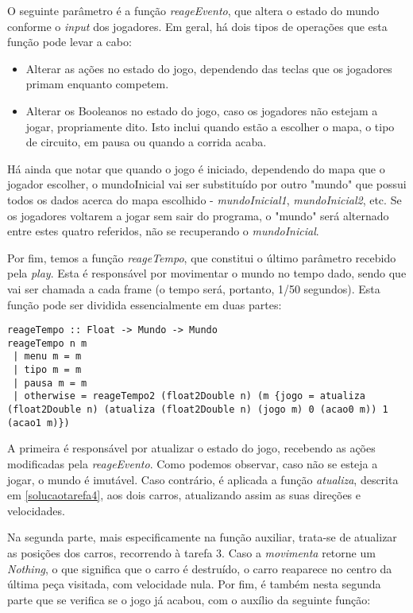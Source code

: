 \documentclass[a4paper]{report}
\begin{document}
O seguinte parâmetro é a função \textit{reageEvento}, que altera o estado do mundo conforme o \textit{input} dos jogadores. Em geral, há dois tipos de operações que esta função pode levar a cabo:

\begin{itemize}
    \item Alterar as ações no estado do jogo, dependendo das teclas que os jogadores primam enquanto competem.
    \item Alterar os Booleanos no estado do jogo, caso os jogadores não estejam a jogar, propriamente dito. Isto inclui quando estão a escolher o mapa, o tipo de circuito, em pausa ou quando a corrida acaba.
\end{itemize}

Há ainda que notar que quando o jogo é iniciado, dependendo do mapa que o jogador escolher, o mundoInicial vai ser substituído por outro "mundo" que possui todos os dados acerca do mapa escolhido - \textit{mundoInicial1}, \textit{mundoInicial2}, etc. Se os jogadores voltarem a jogar sem sair do programa, o "mundo" será alternado entre estes quatro referidos, não se recuperando o \textit{mundoInicial}.

Por fim, temos a função \textit{reageTempo}, que constitui o último parâmetro recebido pela \textit{play}. Esta é responsável por movimentar o mundo no tempo dado, sendo que vai ser chamada a cada frame (o tempo será, portanto, 1/50 segundos). Esta função pode ser dividida essencialmente em duas partes:

\begin{lstlisting}
reageTempo :: Float -> Mundo -> Mundo
reageTempo n m 
 | menu m = m
 | tipo m = m
 | pausa m = m
 | otherwise = reageTempo2 (float2Double n) (m {jogo = atualiza (float2Double n) (atualiza (float2Double n) (jogo m) 0 (acao0 m)) 1 (acao1 m)})
\end{lstlisting}

A primeira é responsável por atualizar o estado do jogo, recebendo as ações modificadas pela \textit{reageEvento}. Como podemos observar, caso não se esteja a jogar, o mundo é imutável. Caso contrário, é aplicada a função \textit{atualiza}, descrita em \ref{solucaotarefa4}, aos dois carros, atualizando assim as suas direções e velocidades.

Na segunda parte, mais especificamente na função auxiliar, trata-se de atualizar as posições dos carros, recorrendo à tarefa 3. Caso a \textit{movimenta} retorne um \textit{Nothing}, o que significa que o carro é destruído, o carro reaparece no centro da última peça visitada, com velocidade nula. Por fim, é também nesta segunda parte que se verifica se o jogo já acabou, com o auxílio da seguinte função:
\end{document}
